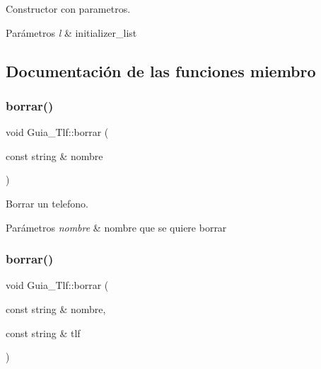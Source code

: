 Constructor con parametros. 


\begin{DoxyParams}{Parámetros}
{\em l} & initializer\+\_\+list \\
\hline
\end{DoxyParams}


\subsection{Documentación de las funciones miembro}
\mbox{\label{classGuia__Tlf_a57e32bbc9e76567d22e5275d4d2a6515}} 
\subsubsection{\texorpdfstring{borrar()}{borrar()}\hspace{0.1cm}{\footnotesize\ttfamily [1/2]}}
{\footnotesize\ttfamily void Guia\+\_\+\+Tlf\+::borrar (\begin{DoxyParamCaption}\item[{const string \&}]{nombre }\end{DoxyParamCaption})}



Borrar un telefono. 


\begin{DoxyParams}{Parámetros}
{\em nombre} & nombre que se quiere borrar \\
\hline
\end{DoxyParams}
\mbox{\label{classGuia__Tlf_af8adac24fd35985b9016a4a38cca60f4}} 
\subsubsection{\texorpdfstring{borrar()}{borrar()}\hspace{0.1cm}{\footnotesize\ttfamily [2/2]}}
{\footnotesize\ttfamily void Guia\+\_\+\+Tlf\+::borrar (\begin{DoxyParamCaption}\item[{const string \&}]{nombre,  }\item[{const string \&}]{tlf }\end{DoxyParamCaption})}



